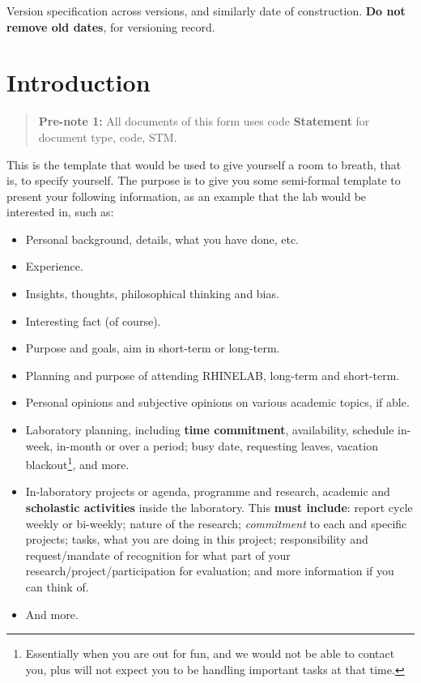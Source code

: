 \documentclass[10pt,a4paper]{article}
\begin{document}
Version specification across versions, and similarly date of construction. \textbf{Do not remove old dates}, for versioning record. 

\section{Introduction}

\begin{quote}
    \textbf{Pre-note 1:} All documents of this form uses code \textbf{Statement} for document type, code, STM. 
\end{quote}

This is the template that would be used to give yourself a room to breath, that is, to specify yourself. The purpose is to give you some semi-formal template to present your following information, as an example that the lab would be interested in, such as: 
\begin{itemize}
    \item Personal background, details, what you have done, etc. 
    \item Experience. 
    \item Insights, thoughts, philosophical thinking and bias. 
    \item Interesting fact (of course). 
    \item Purpose and goals, aim in short-term or long-term. 
    \item Planning and purpose of attending RHINELAB, long-term and short-term. 
    \item Personal opinions and subjective opinions on various academic topics, if able. 
    \item Laboratory planning, including \textbf{time commitment}, availability, schedule in-week, in-month or over a period; busy date, requesting leaves, vacation blackout\footnote{Essentially when you are out for fun, and we would not be able to contact you, plus will not expect you to be handling important tasks at that time.}, and more. 
    \item In-laboratory projects or agenda, programme and research, academic and \textbf{scholastic activities} inside the laboratory. This \textbf{must include}: report cycle weekly or bi-weekly; nature of the research; \textit{commitment} to each and specific projects; tasks, what you are doing in this project; responsibility and request/mandate of recognition for what part of your research/project/participation for evaluation; and more information if you can think of.  
    \item And more. 
\end{itemize}
\end{document}
